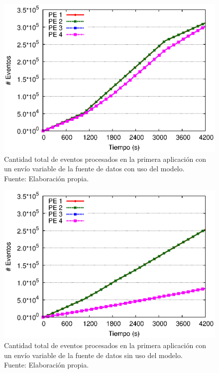 \begin{figure}[!ht]
	\centering
	\captionsetup{justification=centering}
    \includegraphics[scale=0.7]{images/exp/app1/normal/cm/eventCount.eps}
    \caption[Cantidad total de eventos procesados en la primera aplicación con un envío variable de la fuente de datos con uso del modelo.]{Cantidad total de eventos procesados en la primera aplicación con un envío variable de la fuente de datos con uso del modelo.\\Fuente: Elaboración propia.}
    \label{fig:app1-normal-eventCount-cm}
\end{figure}

\begin{figure}[!ht]
	\centering
	\captionsetup{justification=centering}
    \includegraphics[scale=0.7]{images/exp/app1/normal/sm/eventCount.eps}
    \caption[Cantidad total de eventos procesados en la primera aplicación con un envío variable de la fuente de datos sin uso del modelo.]{Cantidad total de eventos procesados en la primera aplicación con un envío variable de la fuente de datos sin uso del modelo.\\Fuente: Elaboración propia.}
    \label{fig:app1-normal-eventCount-sm}
\end{figure}

